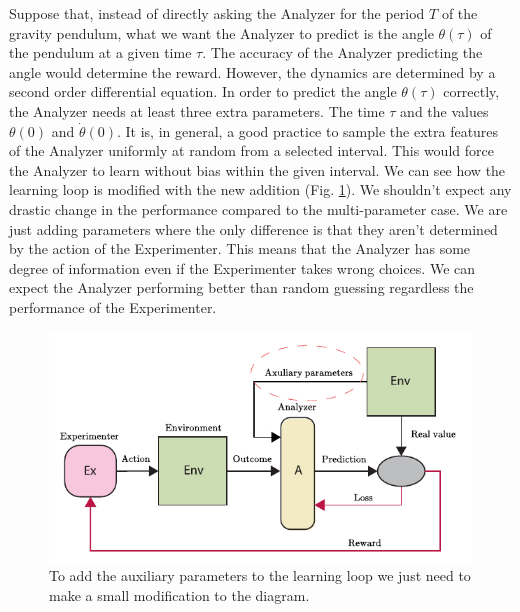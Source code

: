 \documentclass[11pt,a4paper,twoside]{report}
\newcommand{\+}{\textnormal{+} }
\theoremstyle{definition}
\numberwithin{equation}{chapter}
\begin{document}
  Suppose that, instead of directly asking the Analyzer for the period $T$ of
  the gravity pendulum, what we want the Analyzer to predict is the angle
  $\theta(\tau)$ of the pendulum at a given time $\tau$. The accuracy of the
  Analyzer predicting the angle would determine the reward. However, the
  dynamics are determined by a second order differential equation. In order to
  predict the angle $\theta(\tau)$ correctly, the Analyzer needs at least three
  extra parameters. The time $\tau$ and the values $\theta(0)$ and
  $\dot{\theta}(0)$. It is, in general, a good practice to sample the extra
  features of the Analyzer uniformly at random from a selected interval. This
  would force the Analyzer to learn without bias within the given interval. We
  can see how the learning loop is modified with the new addition (Fig.
  \ref{fig:auxiliaryparameters}). We shouldn't expect any drastic change in the
  performance compared to the multi-parameter case. We are just adding
  parameters where the only difference is that they aren't determined by the
  action of the Experimenter. This means that the Analyzer has some
  degree of information even if the Experimenter takes wrong choices. We can
  expect the Analyzer performing better than random guessing regardless the
  performance of the Experimenter.

  \begin{figure}
    \centering
    \includegraphics{figures/Auxiliary Parameters.pdf}
    \caption{To add the auxiliary parameters to the learning loop we just need
    to make a small modification to the diagram.}
    \label{fig:auxiliaryparameters}
  \end{figure}
\end{document}
